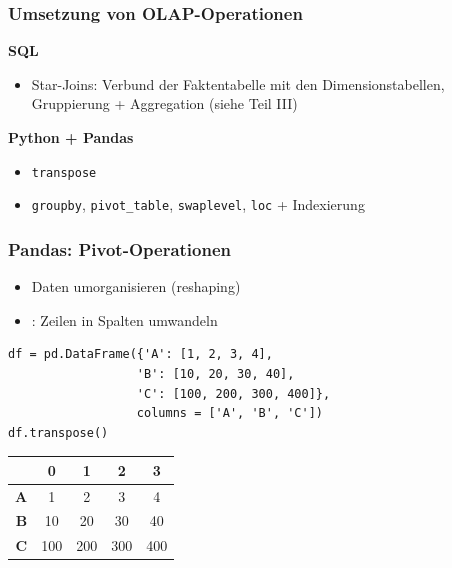 \begin{frame}
    \frametitle{Umsetzung von OLAP-Operationen}

    \textbf{SQL}

    \begin{itemize}
        \item Star-Joins: Verbund der Faktentabelle mit den Dimensionstabellen, Gruppierung + Aggregation (siehe Teil III)
    \end{itemize}

    \textbf{Python + Pandas}

    \begin{itemize}
        \item \texttt{transpose}
        \item \texttt{groupby}, \texttt{pivot\_table}, \texttt{swaplevel}, \texttt{loc} + Indexierung
    \end{itemize}

\end{frame}  


\begin{frame}[fragile]
  \frametitle{Pandas: Pivot-Operationen}

  \begin{itemize}
    \item Daten umorganisieren (reshaping)
      \item {}: Zeilen in Spalten umwandeln
    \end{itemize}

\begin{verbatim}
df = pd.DataFrame({'A': [1, 2, 3, 4], 
                  'B': [10, 20, 30, 40],
                  'C': [100, 200, 300, 400]},
                  columns = ['A', 'B', 'C'])
df.transpose()
\end{verbatim}

{\small
\begin{center}
  \begin{tabular}{r|c|c|c|c|}
    \cline{2-5}
  & \textbf{0} & \textbf{1} & \textbf{2} & \textbf{3} \\
  \hline
  \textbf{A} &  1 & 2 & 3 & 4 \\
  \textbf{B} & 10 & 20 & 30 & 40 \\
  \textbf{C} & 100 & 200 & 300 & 400 \\
  \hline
  \end{tabular}
  \end{center}
  }
\end{frame}

